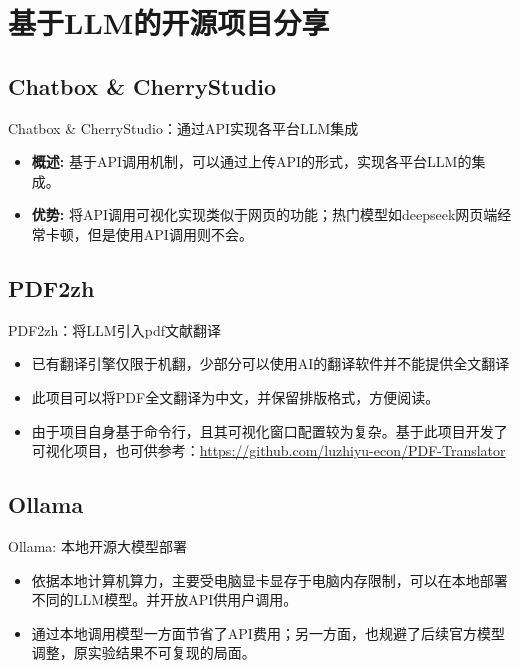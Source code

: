 \documentclass{beamer}
\begin{document}
\section{基于LLM的开源项目分享}
\subsection{Chatbox \& CherryStudio}
\begin{frame}{Chatbox \& CherryStudio：通过API实现各平台LLM集成}
  \begin{itemize}
    \item \textbf{概述:} 基于API调用机制，可以通过上传API的形式，实现各平台LLM的集成。
    \item \textbf{优势:} 将API调用可视化实现类似于网页的功能；热门模型如deepseek网页端经常卡顿，但是使用API调用则不会。
  \end{itemize}
\end{frame}

\subsection{PDF2zh}
\begin{frame}{PDF2zh：将LLM引入pdf文献翻译}
  \begin{itemize}
    \item 已有翻译引擎仅限于机翻，少部分可以使用AI的翻译软件并不能提供全文翻译
    \item 此项目可以将PDF全文翻译为中文，并保留排版格式，方便阅读。
    \item 由于项目自身基于命令行，且其可视化窗口配置较为复杂。基于此项目开发了可视化项目，也可供参考：\url{https://github.com/luzhiyu-econ/PDF-Translator}
  \end{itemize}
\end{frame}

\subsection{Ollama}
\begin{frame}{Ollama: 本地开源大模型部署}
  \begin{itemize}
    \item 依据本地计算机算力，主要受电脑显卡显存于电脑内存限制，可以在本地部署不同的LLM模型。并开放API供用户调用。
    \item 通过本地调用模型一方面节省了API费用；另一方面，也规避了后续官方模型调整，原实验结果不可复现的局面。
  \end{itemize}
\end{frame}
\end{document}
